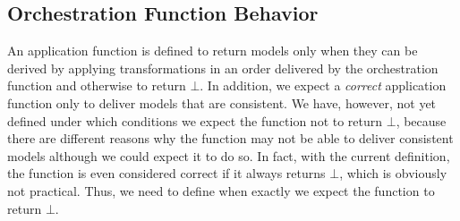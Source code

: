 \subsection{Orchestration Function Behavior} %
\label{chap:orchestration:problem:function_behavior}

An application function is defined to return models only when they can be derived by applying transformations in an order delivered by the orchestration function and otherwise to return $\bot$.
In addition, we expect a \emph{correct} application function only to deliver models that are consistent.
We have, however, not yet defined under which conditions we expect the function not to return $\bot$, because there are different reasons why the function may not be able to deliver consistent models although we could expect it to do so.
In fact, with the current definition, the function is even considered correct if it always returns $\bot$, which is obviously not practical.
Thus, we need to define when exactly we expect the function to return $\bot$.

